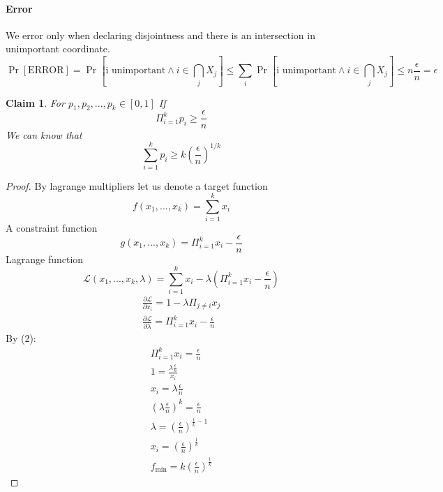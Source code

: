 \documentclass{article}
\theoremstyle{plain}
\newtheorem{claim}{Claim}
\begin{document}
\paragraph{Error}
We error only when declaring disjointness and there is an intersection in unimportant coordinate.
\begin{equation*}
    \Pr[\text{ERROR}] = \Pr[\text{i unimportant} \land i \in \bigcap_j X_j] \leq \sum_i \Pr[\text{i unimportant} \land i \in \bigcap
    _j X_j] \leq n\frac{\epsilon}{n} = \epsilon
\end{equation*}
\begin{claim}
For $p_1, p_2, ... , p_k \in [0,1]$ \newline
If
\begin{equation*}
    \Pi_{i=1}^{k}p_i \geq \frac{\epsilon}{n}
\end{equation*}
We can know that
\begin{equation*}
    \sum_{i=1}^{k}p_i \geq k\left(\frac{\epsilon}{n}\right)^{1/k}
\end{equation*}
\end{claim}
\begin{proof}
By lagrange multipliers let us denote a target function 
\begin{equation*}
    f(x_1, ... , x_k) = \sum_{i=1}^{k}x_i
\end{equation*}
A constraint function
\begin{equation*}
    g(x_1, ... , x_k) = \Pi_{i=1}^{k}x_i - \frac{\epsilon}{n} 
\end{equation*}
Lagrange function
\begin{equation*}
    \mathcal{L}(x_1, ... , x_k, \lambda) = \sum_{i=1}^{k}x_i - \lambda\left(\Pi_{i=1}^{k}x_i - \frac{\epsilon}{n}  \right)
\end{equation*}
\begin{align*}
    \frac{\partial\mathcal{L}}{\partial x_i} = 1 - \lambda\Pi_{j \neq i}x_j  \\
    \frac{\partial\mathcal{L}}{\partial \lambda} = \Pi_{i=1}^{k}x_i - \frac{\epsilon}{n}
\end{align*}
By (2):
\begin{align*}
    \Pi_{i=1}^{k}x_i = \frac{\epsilon}{n} \\
    1 = \frac{\lambda\frac{\epsilon}{n}}{x_i} \\ 
    x_i = \lambda\frac{\epsilon}{n} \\
    \left(\lambda\frac{\epsilon}{n}\right)^k = \frac{\epsilon}{n} \\
    \lambda = \left(\frac{\epsilon}{n}\right)^{\frac{1}{k} - 1} \\
    x_i = \left(\frac{\epsilon}{n}\right)^{\frac{1}{k}} \\
    f_{\text{min}} = k\left(\frac{\epsilon}{n}\right)^{\frac{1}{k}}
\end{align*}
\end{proof}
\end{document}

